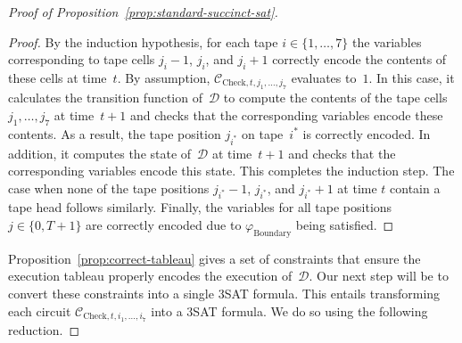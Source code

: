 \documentclass[11pt]{article}
\theoremstyle{definition}
\newcommand{\decider}{\mathcal{D}}
\newcommand{\circuit}{\mathcal{C}}
\begin{document}
\begin{proof}[Proof of Proposition~\ref{prop:standard-succinct-sat}]
\begin{proof}
  By the induction hypothesis, for each tape $i \in \{1, \ldots, 7\}$ the
  variables corresponding to tape cells $j_i-1$, $j_i$, and $j_i+1$ correctly
  encode the contents of these cells at time~$t$.
  By assumption, $\circuit_{\mathrm{Check}, t, j_1, \ldots, j_7}$ evaluates
  to~$1$.
  In this case, it calculates the transition function of~$\decider$ to compute
  the contents of the tape cells $j_1, \ldots, j_7$ at time~$t+1$ and checks
  that the corresponding variables encode these contents.
  As a result, the tape position $j_{i^*}$ on tape~$i^*$ is correctly encoded.
  In addition, it computes the state of~$\decider$ at time~$t+1$ and checks that
  the corresponding variables encode this state.
  This completes the induction step.
  The case when none of the tape positions $j_{i^*}-1$, $j_{i^*}$, and
  $j_{i^*}+1$ at time $t$ contain a tape head follows similarly.
  Finally, the variables for all tape positions $j \in \{0, T+1\}$ are correctly
  encoded due to $\varphi_{\mathrm{Boundary}}$ being satisfied.
\end{proof}
  
Proposition~\ref{prop:correct-tableau} gives a set of constraints that ensure
the execution tableau properly encodes the execution of~$\decider$.
Our next step will be to convert these constraints into a single 3SAT formula.
This entails transforming each circuit $\circuit_{\mathrm{Check}, t, i_1,
  \ldots, i_7}$ into a 3SAT formula.
We do so using the following reduction.


\end{proof}
\end{document}
